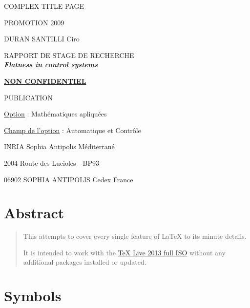 \documentclass[12pt]{article}
\begin{document}
  \begin{titlepage}
    COMPLEX TITLE PAGE

    PROMOTION 2009

    DURAN SANTILLI Ciro

    \vspace{40 mm}

    \begin{center}

      {\large RAPPORT DE STAGE DE RECHERCHE}\\[0.5cm]

      \underline{ \large \bfseries \itshape Flatness in control systems}

      \vspace{10 mm}

      \underline{ \bfseries NON CONFIDENTIEL }

      PUBLICATION

    \end{center}

    \vspace{40 mm}

    \underline{Option} : Mathématiques apliquées

    \underline{Champ de l'option} : Automatique et Contrôle

    \vspace{5 mm}

    INRIA Sophia Antipolis Méditerrané

    2004 Route des Lucioles - BP93

    06902 SOPHIA ANTIPOLIS Cedex France
  \end{titlepage}

  \newpage

\section{Abstract} \label{abstract}

  \begin{abstract}
    This attempts to cover every single feature of LaTeX to its minute details.

    It is intended to work with the \href{https://www.tug.org/texlive/acquire-iso.html}{TeX Live 2013 full ISO} without any additional packages installed or updated.
  \end{abstract}
  \newpage

\section{Symbols}\label{symbols}
\end{document}
